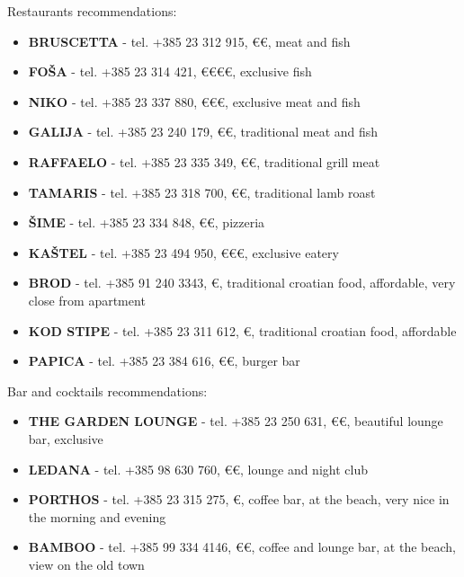 \documentclass[12pt]{article}
\begin{document}
\begin{center}
\Huge
Restaurants recommendations:
\end{center}
\uwave{\hspace{15cm}}

\begin{itemize}
\item \textbf{BRUSCETTA} - tel. +385 23 312 915, €€, meat and fish 
\item \textbf{FOŠA} - tel. +385 23 314 421, €€€€, exclusive fish
\item \textbf{NIKO} - tel. +385 23 337 880, €€€, exclusive meat and fish
\item \textbf{GALIJA} - tel. +385 23 240 179, €€, traditional meat and fish
\item \textbf{RAFFAELO} - tel. +385 23 335 349, €€, traditional grill meat
\item \textbf{TAMARIS} - tel. +385 23 318 700, €€, traditional lamb roast
\item \textbf{ŠIME} - tel. +385 23 334 848, €€, pizzeria
\item \textbf{KAŠTEL} - tel. +385 23 494 950, €€€, exclusive eatery
\item \textbf{BROD} - tel. +385 91 240 3343, €, traditional croatian food, affordable, very close from apartment
\item \textbf{KOD STIPE} - tel. +385 23 311 612, €, traditional croatian food, affordable

\item \textbf{PAPICA} - tel. +385 23 384 616, €€, burger bar
\end{itemize}

\vspace{0.5cm}

\begin{center}
\Huge
Bar and cocktails recommendations:
\end{center}
\uwave{\hspace{15cm}}

\begin{itemize}
\item \textbf{THE GARDEN LOUNGE} - tel. +385 23 250 631, €€, beautiful lounge bar, exclusive
\item \textbf{LEDANA} - tel. +385 98 630 760, €€, lounge and night club
\item \textbf{PORTHOS} - tel. +385 23 315 275, €, coffee bar, at the beach, very nice in the morning and evening
\item \textbf{BAMBOO} - tel. +385 99 334 4146, €€, coffee and lounge bar, at the beach, view on the old town

\end{itemize}
\end{document}
